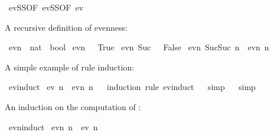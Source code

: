 \begin{isabellebody}
\isamarkupfalse%
%
\endisatagproof
{\isafoldproof}%
%
\isadelimproof
\isanewline
%
\endisadelimproof
\isanewline
{}\isamarkupfalse%
\ evSS{\isacharbrackleft}{\kern0pt}OF\ evSS{\isacharbrackleft}{\kern0pt}OF\ ev{}{\isacharbrackright}{\kern0pt}{\isacharbrackright}{\kern0pt}%
\begin{isamarkuptext}%
A recursive definition of evenness:%
\end{isamarkuptext}\isamarkuptrue%
\isamarkupfalse%
\ evn\ {\isacharcolon}{\kern0pt}{\isacharcolon}{\kern0pt}\ {\isachardoublequoteopen}nat\ {\isasymRightarrow}\ bool{\isachardoublequoteclose}\ \isanewline
{\isachardoublequoteopen}evn\ {}\ {\isacharequal}{\kern0pt}\ True{\isachardoublequoteclose}\ {\isacharbar}{\kern0pt}\isanewline
{\isachardoublequoteopen}evn\ {\isacharparenleft}{\kern0pt}Suc\ {}{\isacharparenright}{\kern0pt}\ {\isacharequal}{\kern0pt}\ False{\isachardoublequoteclose}\ {\isacharbar}{\kern0pt}\isanewline
{\isachardoublequoteopen}evn\ {\isacharparenleft}{\kern0pt}Suc{\isacharparenleft}{\kern0pt}Suc\ n{\isacharparenright}{\kern0pt}{\isacharparenright}{\kern0pt}\ {\isacharequal}{\kern0pt}\ evn\ n{\isachardoublequoteclose}%
\begin{isamarkuptext}%
A simple example of rule induction:%
\end{isamarkuptext}\isamarkuptrue%
\isamarkupfalse%
\ ev{\isachardot}{\kern0pt}induct\isanewline
{}\isamarkupfalse%
\ {\isachardoublequoteopen}ev\ n\ {\isasymLongrightarrow}\ evn\ n{\isachardoublequoteclose}\isanewline
%
\isadelimproof
\ \ %
\endisadelimproof
%
\isatagproof
{}\isamarkupfalse%
{\isacharparenleft}{\kern0pt}induction\ rule{\isacharcolon}{\kern0pt}\ ev{\isachardot}{\kern0pt}induct{\isacharparenright}{\kern0pt}\isanewline
\ \ \isamarkupfalse%
{\isacharparenleft}{\kern0pt}simp{\isacharparenright}{\kern0pt}\isanewline
\ \ \isamarkupfalse%
{\isacharparenleft}{\kern0pt}simp{\isacharparenright}{\kern0pt}\isanewline
\ \ \isamarkupfalse%
%
\endisatagproof
{\isafoldproof}%
%
\isadelimproof
%
\endisadelimproof
%
\begin{isamarkuptext}%
An induction on the computation of :%
\end{isamarkuptext}\isamarkuptrue%
\isamarkupfalse%
\ evn{\isachardot}{\kern0pt}induct\isanewline
{}\isamarkupfalse%
\ {\isachardoublequoteopen}evn\ n\ {\isasymLongrightarrow}\ ev\ n{\isachardoublequoteclose}\isanewline

\end{isabellebody}
